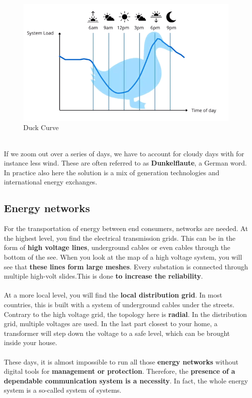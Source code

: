 \documentclass[../summary.tex]{subfiles}
\begin{document}
	\begin{figure}[H]
		\centering
		\includegraphics[width=0.6\linewidth]{../images/4-duck-curve}
		\caption{Duck Curve}
		\label{fig:duck-curve}
	\end{figure}
	
	\ \\
	If we zoom out over a series of days, we have to account for cloudy days with for instance less wind. These are often referred to as \textbf{Dunkelflaute}, a German word. In practice also here the solution is a mix of generation technologies and international energy exchanges.
	
	\subsection{Energy networks}
	
	For the transportation of energy between end consumers, networks are needed. At the highest level, you find the electrical transmission grids. This can be in the form of \textbf{high voltage lines}, underground cables or even cables through the bottom of the see. When you look at the map of a high voltage system, you will see that \textbf{these lines form large meshes}. Every substation is connected through multiple high-volt slides.This is done \textbf{to increase the reliability}. 
	\\\\
	At a more local level, you will find the \textbf{local distribution grid}. In most countries, this is built with a system of underground cables under the streets. Contrary to the high voltage grid, the topology here is \textbf{radial}. In the distribution grid, multiple voltages are used. In the last part closest to your home, a transformer will step down the voltage to a safe level, which can be brought inside your house. 
	\\\\
	These days, it is almost impossible to run all those \textbf{energy networks} without digital tools for \textbf{management or protection}. Therefore, the \textbf{presence of a dependable communication system is a necessity}. In fact, the whole energy system is a so-called system of systems.
	
\end{document}
